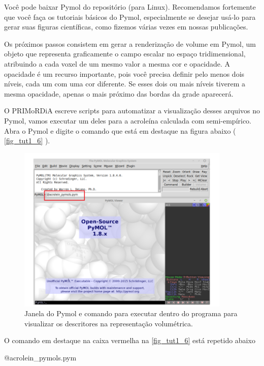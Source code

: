 \documentclass[a4paper,11pt]{refart}
\begin{document}
Você pode baixar Pymol do repositório (para Linux). Recomendamos fortemente que você faça os tutoriais básicos do Pymol, especialmente se desejar usá-lo para gerar suas figuras científicas, como fizemos várias vezes em nossas publicações. 

Os próximos passos consistem em gerar a renderização de volume em Pymol, um objeto que representa graficamente o campo escalar no espaço tridimensional, atribuindo a cada voxel de um mesmo valor a mesma cor e opacidade. A opacidade é um recurso importante, pois você precisa definir pelo menos dois níveis, cada um com uma cor diferente. Se esses dois ou mais níveis tiverem a mesma opacidade, apenas o mais próximo das bordas da grade aparecerá.

O PRIMoRDiA escreve scripts para automatizar a visualização desses arquivos no Pymol, vamos executar um deles para a acroleína calculada com semi-empírico. Abra o Pymol e digite o comando que está em destaque na figura abaixo ( \autoref{fig_tut1_6} ). 

\hspace*{-\leftmarginwidth}
\begin{minipage}{\fullwidth}
\begin{figure}[H]
\begin{center}
\includegraphics[width=4in]{images/img7}
\caption{Janela do Pymol e comando para executar dentro do programa para visualizar os descritores na representação volumétrica.}
\label{fig_tut1_6}
\end{center}
\end{figure}
\end{minipage}

O comando em destaque na caixa vermelha na \autoref{fig_tut1_6} está repetido abaixo

\hspace*{-\leftmarginwidth}
\begin{minipage}{\fullwidth}
	\begin{pymol}@acrolein_pymols.pym\end{pymol}
\end{minipage}
\end{document}
